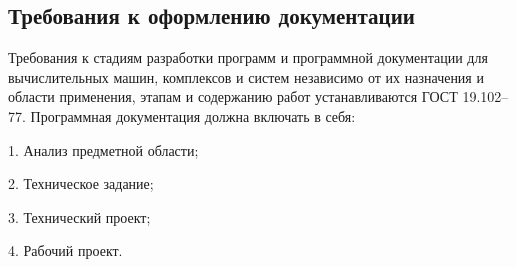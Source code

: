 \subsection{Требования к оформлению документации}

Требования к стадиям разработки программ и программной документации для вычислительных машин, комплексов и систем независимо от их
назначения и области применения, этапам и содержанию работ устанавливаются ГОСТ 19.102–77. Программная документация должна включать в себя:

1. Анализ предметной области;

2. Техническое задание;

3. Технический проект;

4. Рабочий проект.

